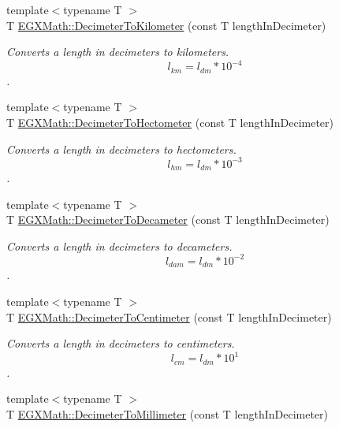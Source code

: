 \begin{DoxyCompactItemize}
{\footnotesize template$<$typename T $>$ }\\T \mbox{\hyperlink{group___e_g_x_math-_conversions-_length_conversions-_decimeter-_s_i_gaad90a14189b6602a87b449adb1cd5e82}{E\+G\+X\+Math\+::\+Decimeter\+To\+Kilometer}} (const T length\+In\+Decimeter)
\begin{DoxyCompactList}\small\item\em Converts a length in decimeters to kilometers. \[ l_{km}=l_{dm} * 10^{-4} \]. \end{DoxyCompactList}\item 
{\footnotesize template$<$typename T $>$ }\\T \mbox{\hyperlink{group___e_g_x_math-_conversions-_length_conversions-_decimeter-_s_i_gaa84a9ad8f41f664e41c4c390186dfa1b}{E\+G\+X\+Math\+::\+Decimeter\+To\+Hectometer}} (const T length\+In\+Decimeter)
\begin{DoxyCompactList}\small\item\em Converts a length in decimeters to hectometers. \[ l_{hm}=l_{dm} * 10^{-3} \]. \end{DoxyCompactList}\item 
{\footnotesize template$<$typename T $>$ }\\T \mbox{\hyperlink{group___e_g_x_math-_conversions-_length_conversions-_decimeter-_s_i_ga20742de42223dbcd8af88e4e9feccfa4}{E\+G\+X\+Math\+::\+Decimeter\+To\+Decameter}} (const T length\+In\+Decimeter)
\begin{DoxyCompactList}\small\item\em Converts a length in decimeters to decameters. \[ l_{dam}=l_{dm} * 10^{-2} \]. \end{DoxyCompactList}\item 
{\footnotesize template$<$typename T $>$ }\\T \mbox{\hyperlink{group___e_g_x_math-_conversions-_length_conversions-_decimeter-_s_i_ga032e40ec973eb890908799b87ba41710}{E\+G\+X\+Math\+::\+Decimeter\+To\+Centimeter}} (const T length\+In\+Decimeter)
\begin{DoxyCompactList}\small\item\em Converts a length in decimeters to centimeters. \[ l_{cm}=l_{dm} * 10^{1} \]. \end{DoxyCompactList}\item 
{\footnotesize template$<$typename T $>$ }\\T \mbox{\hyperlink{group___e_g_x_math-_conversions-_length_conversions-_decimeter-_s_i_gad899e8bf5ade8cdc82e00b0fc81c2ee5}{E\+G\+X\+Math\+::\+Decimeter\+To\+Millimeter}} (const T length\+In\+Decimeter)

\end{DoxyCompactItemize}
